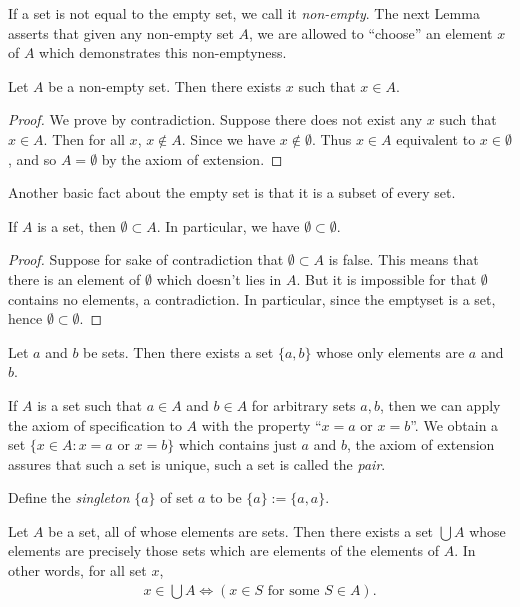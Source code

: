 If a set is not equal to the empty set, we call it \emph{non-empty}. The next Lemma asserts that given any non-empty set $A$, we are allowed to ``choose'' an element $x$ of $A$ which demonstrates this non-emptyness.

\begin{lemma}
    Let $A$ be a non-empty set. Then there exists $x$ such that $x \in A$.
\end{lemma}

\begin{proof}
    We prove by contradiction. Suppose there does not exist any $x$ such that $x \in A$. Then for all $x$, $x \notin A$. Since we have $x \notin \emptyset$. Thus $x \in A$ equivalent to $x \in \emptyset$, and so $A = \emptyset$ by the axiom of extension.
\end{proof}

Another basic fact about the empty set is that it is a subset of every set.
\begin{lemma}
    If $A$ is a set, then $\emptyset \subset A$. In particular, we have $\emptyset \subset \emptyset$.
\end{lemma}

\begin{proof}
    Suppose for sake of contradiction that $\emptyset \subset A$ is false. This means that there is an element of $\emptyset$ which doesn't lies in $A$. But it is impossible for that $\emptyset$ contains no elements, a contradiction. In particular, since the emptyset is a set, hence $\emptyset \subset \emptyset$.
\end{proof}


\begin{axiom}
    Let $a$ and $b$ be sets. Then there exists a set $\{a, b\}$ whose only elements are $a$ and $b$.
\end{axiom}

If $A$ is a set such that $a \in A$ and $b \in A$ for arbitrary sets $a, b$, then we can apply the axiom of specification to $A$ with the property ``$x = a$ or $x = b$''. We obtain a set $\{x \in A : x = a \text{ or } x = b\}$ which contains just $a$ and $b$, the axiom of extension assures that such a set is unique, such a set is called the \emph{pair}.

\begin{definition}[Singleton]
    Define the \emph{singleton} $\{a\}$ of set $a$ to be $\{a\} := \{a, a\}$.
\end{definition}

\begin{axiom}
    Let $A$ be a set, all of whose elements are sets. Then there exists a set $\bigcup A$ whose elements are precisely those sets which are elements of the elements of $A$. In other words, for all set $x$,
        \begin{align*}
            x \in \bigcup A
            \Longleftrightarrow
            (x \in S \text{ for some } S \in A).
        \end{align*}
\end{axiom}

